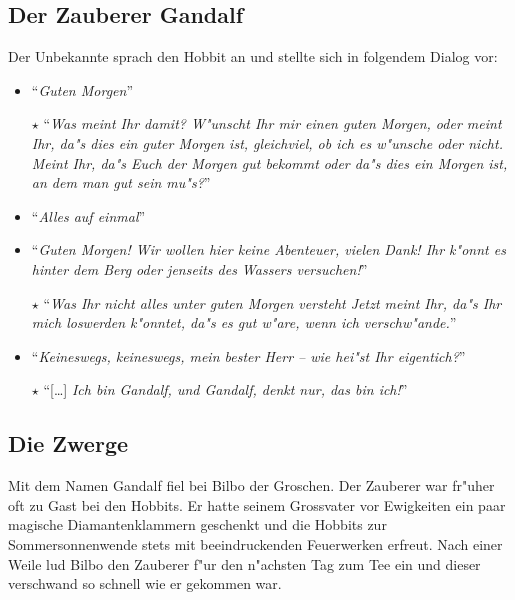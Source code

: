\documentclass[a4paper]{article}
\begin{document}
\subsection{Der Zauberer Gandalf}
%
Der Unbekannte
sprach den Hobbit an und stellte sich in folgendem Dialog
vor:
\begin{itemize}
\item 
"`\textit{Guten Morgen}"'

\item[$\star$]
"`\textit{Was meint Ihr damit? W"unscht Ihr mir einen guten 
Morgen, oder meint Ihr, da"s dies ein \emph{guter Morgen} ist, gleichviel, ob 
ich es w"unsche oder nicht. Meint Ihr, da"s Euch der Morgen gut bekommt oder 
da"s dies ein Morgen ist, an dem man gut sein mu"s?}"'

\item
"`\textit{Alles auf einmal}"'

\item
"`\textit{Guten Morgen! Wir wollen hier 
keine Abenteuer, vielen Dank! Ihr k"onnt es hinter dem Berg oder jenseits des 
Wassers versuchen!}"'

\item[$\star$]
"`\textit{Was Ihr nicht alles unter guten Morgen versteht Jetzt meint Ihr, 
da"s Ihr mich loswerden k"onntet, da"s es gut w"are, wenn ich verschw"ande.}"' 

\item
"`\textit{Keineswegs, keineswegs, mein bester Herr -- wie hei"st Ihr eigentich?}"'

\item[$\star$]
"`[\dots] \textit{Ich bin Gandalf, und Gandalf, denkt nur, das bin ich!}"'
\end{itemize}
\subsection{Die Zwerge}
%
Mit dem Namen Gandalf fiel bei Bilbo der Groschen. Der Zauberer war fr"uher
oft zu Gast bei den Hobbits. Er hatte
seinem Grossvater vor Ewigkeiten ein paar magische Diamantenklammern 
geschenkt und die Hobbits zur Sommersonnenwende stets mit beeindruckenden
Feuerwerken erfreut. Nach einer Weile lud Bilbo den Zauberer f"ur den
n"achsten Tag zum Tee ein und dieser verschwand so schnell wie er
gekommen war.
 
\end{document}

